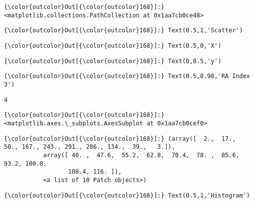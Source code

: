 \documentclass[11pt]{article}
\begin{document}
\begin{Verbatim}[commandchars=\\\{\}]
{\color{outcolor}Out[{\color{outcolor}168}]:} <matplotlib.collections.PathCollection at 0x1aa7cb0ce48>
\end{Verbatim}
            
\begin{Verbatim}[commandchars=\\\{\}]
{\color{outcolor}Out[{\color{outcolor}168}]:} Text(0.5,1,'Scatter')
\end{Verbatim}
            
\begin{Verbatim}[commandchars=\\\{\}]
{\color{outcolor}Out[{\color{outcolor}168}]:} Text(0.5,0,'X')
\end{Verbatim}
            
\begin{Verbatim}[commandchars=\\\{\}]
{\color{outcolor}Out[{\color{outcolor}168}]:} Text(0,0.5,'y')
\end{Verbatim}
            
\begin{Verbatim}[commandchars=\\\{\}]
{\color{outcolor}Out[{\color{outcolor}168}]:} Text(0.5,0.98,'RA Index 3')
\end{Verbatim}
            
    \begin{Verbatim}[commandchars=\\\{\}]
4

    \end{Verbatim}

\begin{Verbatim}[commandchars=\\\{\}]
{\color{outcolor}Out[{\color{outcolor}168}]:} <matplotlib.axes.\_subplots.AxesSubplot at 0x1aa7cb0cef0>
\end{Verbatim}
            
\begin{Verbatim}[commandchars=\\\{\}]
{\color{outcolor}Out[{\color{outcolor}168}]:} (array([  2.,  17.,  50., 167., 243., 291., 286., 134.,  39.,   3.]),
           array([ 40. ,  47.6,  55.2,  62.8,  70.4,  78. ,  85.6,  93.2, 100.8,
                  108.4, 116. ]),
           <a list of 10 Patch objects>)
\end{Verbatim}
            
\begin{Verbatim}[commandchars=\\\{\}]
{\color{outcolor}Out[{\color{outcolor}168}]:} Text(0.5,1,'Histogram')
\end{Verbatim}
            
\end{document}
